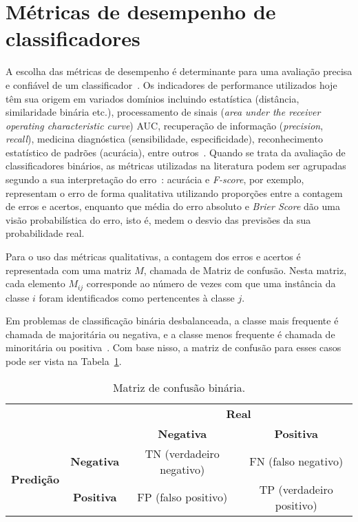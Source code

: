 \section{Métricas de desempenho de classificadores}

A escolha das métricas de desempenho é determinante para uma avaliação precisa e confiável de um classificador~\cite{Gaudreault2021}. Os indicadores de performance utilizados hoje têm sua origem em variados domínios incluindo estatística (distância, similaridade binária etc.), processamento de sinais (\textit{area under the receiver operating characteristic curve}) AUC, recuperação de informação (\textit{precision}, \textit{recall}), medicina diagnóstica (sensibilidade, especificidade), reconhecimento estatístico de padrões (acurácia), entre outros~\cite{Canbek2023}. Quando se trata da avaliação de classificadores binários, as métricas utilizadas na literatura podem ser agrupadas segundo a sua interpretação do erro~\cite{Ferri2009}:  acurácia e \textit{F-score}, por exemplo, representam o erro de forma qualitativa utilizando proporções entre a contagem de erros e acertos, enquanto que média do erro absoluto e \textit{Brier Score} dão uma visão probabilística do erro, isto é, medem o desvio das previsões da sua probabilidade real.

Para o uso das métricas qualitativas, a contagem dos erros e acertos é representada com uma matriz \(M\), chamada de Matriz de confusão. Nesta matriz, cada elemento \(M_{ij}\) corresponde ao número de vezes com que uma instância da classe \(i\) foram identificados como pertencentes à classe \(j\).

Em problemas de classificação binária desbalanceada, a classe mais frequente é chamada de majoritária ou negativa, e a classe menos frequente é chamada de minoritária ou positiva~\cite{Seiffert2008,Batuwita2010}. Com base nisso, a matriz de confusão para esses casos pode ser vista na Tabela~\ref{tab:matriz-confusao}.

\begin{table}[htbp]
  \centering
  \begin{tabular}{cc|cc|}
    \cline{3-4}
    \multicolumn{2}{c|}{\multirow{2}{*}{}}                   & \multicolumn{2}{c|}{\textbf{Real}}                                                                                \\ \cline{3-4}
    \multicolumn{2}{c|}{}                                    & \multicolumn{1}{c|}{\textbf{Negativa}} & \textbf{Positiva}                                                        \\ \hline
    \multicolumn{1}{|c|}{\multirow{2}{*}{\textbf{Predição}}} & \textbf{Negativa}                      & \multicolumn{1}{c|}{TN (verdadeiro negativo)} & FN (falso negativo)      \\ \cline{2-4}
    \multicolumn{1}{|c|}{}                                   & \textbf{Positiva}                      & \multicolumn{1}{c|}{FP (falso positivo)}      & TP (verdadeiro positivo) \\ \hline
  \end{tabular}
  \caption{Matriz de confusão binária.}
  \label{tab:matriz-confusao}
\end{table}


